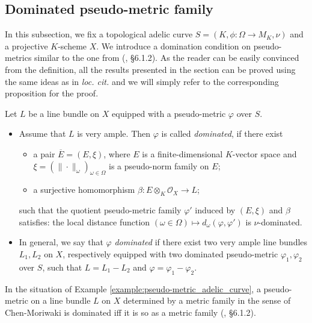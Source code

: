 \documentclass [11pt,reqno]{amsart}
\newcommand{\1}{\mathmybb{1}}
\def\cO{{\mathcal{O}}}
\begin{document}
\subsection{Dominated pseudo-metric family}
\label{sub:dominated_pseudo-metric_family}

In this subsection, we fix a topological adelic curve $S=(K,\phi:\Omega\to M_K,\nu)$ and a projective $K$-scheme $X$. We introduce a domination condition on pseudo-metrics similar to the one from (\cite{ChenMori}, \S 6.1.2). As the reader can be easily convinced from the definition, all the results presented in the section can be proved using the same ideas as in \emph{loc. cit.} and we will simply refer to the corresponding proposition for the proof. %

\begin{definition}
\label{def:dominated_pseudo-metric_family}
Let $L$ be a line bundle on $X$ equipped with a pseudo-metric $\varphi$ over $S$.
\begin{itemize}
	\item[(1)] Assume that $L$ is very ample. Then $\varphi$ is called \emph{dominated}, if there exist 
\begin{itemize}
	\item[(i)] a pair $\overline{E}=(E,\xi)$, where $E$ is a finite-dimensional $K$-vector space and $\xi=(\|\cdot\|_{\omega})_{\omega\in\Omega}$ is a pseudo-norm family on $E$;
	\item[(ii)] a surjective homomorphism $\beta: E\otimes_{K}\cO_{X} \to L$;
\end{itemize}	
such that the quotient pseudo-metric family $\varphi'$ induced by $(E,\xi)$ and $\beta$ satisfies: the local distance function $(\omega\in\Omega)\mapsto d_{\omega}(\varphi,\varphi')$ is $\nu$-dominated. 
	\item[(2)] In general, we say that $\varphi$ \emph{dominated} if there exist two very ample line bundles $L_{1},L_{2}$ on $X$, respectively equipped with two dominated pseudo-metric $\varphi_1,\varphi_2$ over $S$, such that $L=L_1-L_2$ and $\varphi=\varphi_1-\varphi_2$. 
\end{itemize}
\end{definition}

\begin{example}
\label{example:dominated_pseudo-metric_adelic_curve}
In the situation of Example \ref{example:pseudo-metric_adelic_curve}, a pseudo-metric on a line bundle $L$ on $X$ determined by a metric family in the sense of Chen-Moriwaki is dominated iff it is so as a metric family (\cite{ChenMori}, \S 6.1.2).  
\end{example}
\end{document}
